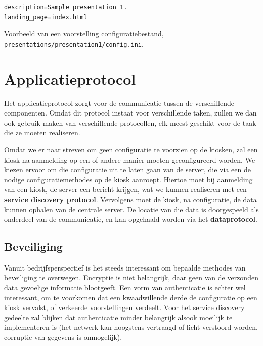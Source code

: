 \documentclass[verslag.tex]{subfiles}
\begin{document}
\begin{codefragment}
\begin{verbatim}
description=Sample presentation 1.
landing_page=index.html
\end{verbatim}
\caption{Voorbeeld van een voorstelling configuratiebestand, \texttt{presentations/presentation1/config.ini}.}
\end{codefragment}

\section{Applicatieprotocol}
\label{ontwerp:applicatie:applicatieprotocol}

Het applicatieprotocol zorgt voor de communicatie tussen de verschillende componenten. Omdat dit protocol instaat voor verschillende taken, zullen we dan ook gebruik maken van verschillende protocollen, elk meest geschikt voor de taak die ze moeten realiseren.

Omdat we er naar streven om geen configuratie te voorzien op de kiosken, zal een kiosk na aanmelding op een of andere manier moeten geconfigureerd worden. We kiezen ervoor om die configuratie uit te laten gaan van de server, die via een  de nodige configuratiemethodes op de kiosk aanroept. Hiertoe moet bij aanmelding van een kiosk, de server een bericht krijgen, wat we kunnen realiseren met een \textbf{service discovery protocol}. Vervolgens moet de kiosk, na configuratie, de data kunnen ophalen van de centrale server. De locatie van die data is doorgespeeld als onderdeel van de communicatie, en kan opgehaald worden via het \textbf{dataprotocol}.

\subsection{Beveiliging}

Vanuit bedrijfsperspectief is het steeds interessant om bepaalde methodes van beveiliging te overwegen. Encryptie is niet belangrijk, daar geen van de verzonden data gevoelige informatie blootgeeft. Een vorm van authenticatie is echter wel interessant, om te voorkomen dat een kwaadwillende derde de configuratie op een kiosk vervalst, of verkeerde voorstellingen verdeelt. Voor het service discovery gedeelte zal blijken dat authenticatie minder belangrijk alsook moeilijk te implementeren is (het netwerk kan hoogstens vertraagd of licht verstoord worden, corruptie van gegevens is onmogelijk).
\end{document}
